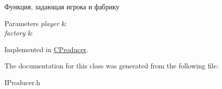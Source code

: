 Функция, задающая игрока и фабрику 


\begin{DoxyParams}{Parameters}
{\em player} & \\
\hline
{\em factory} & \\
\hline
\end{DoxyParams}


Implemented in \hyperlink{classCProducer_a2f3a3115610b6f15d03efd30c4e32733}{C\+Producer}.



The documentation for this class was generated from the following file\+:\begin{DoxyCompactItemize}
\item 
I\+Producer.\+h\end{DoxyCompactItemize}
